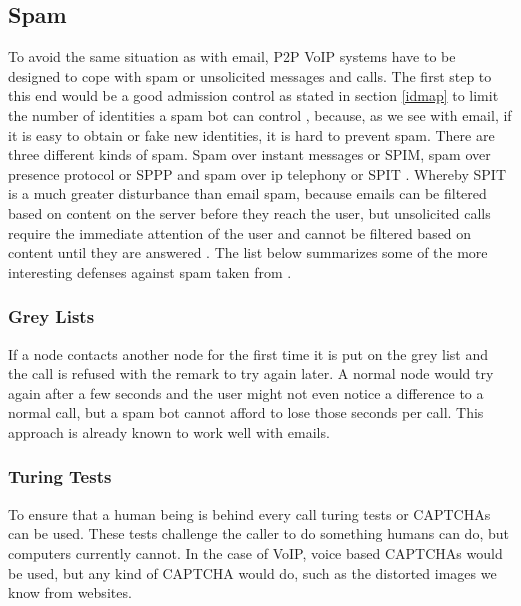 \documentclass[a4paper,10pt]{article}
\begin{document}
\subsection{Spam}
\label{spam}
To avoid the same situation as with email, P2P VoIP systems have to be designed
to cope with spam or unsolicited messages and calls. The first step to this end
would be a good admission control as stated in section \ref{idmap} to limit the
number of identities a spam bot can control \cite{touceda}, because, as we see
with email,
if it is easy to obtain or fake new identities, it is hard to prevent spam.
There are three different kinds of spam. Spam over instant messages or SPIM,
spam over
presence protocol or SPPP and spam over ip telephony or SPIT \cite{touceda}.
Whereby SPIT is a much greater disturbance than email spam, because emails can
be filtered based on content on the server before they reach the user, but
unsolicited calls require the immediate attention of the user and cannot be
filtered
based on content until they are answered \cite{heikkilae}. The list below
summarizes some of the more interesting defenses against spam taken from
\cite{touceda}.

\subsubsection{Grey Lists}
If a node contacts another node for the first time it is put on the grey list
and the call is refused with the remark to try again later.
A normal node would try again after a few seconds and the user might not even
notice a difference to a normal call, but a spam bot cannot afford to lose those
seconds per call.
This approach is already known to work well with emails.



\subsubsection{Turing Tests}
To ensure that a human being is behind every call turing tests or CAPTCHAs can
be used. These tests challenge the caller to do something
humans can do, but computers currently cannot. In the case of VoIP, voice based
CAPTCHAs would be used, but any kind
of CAPTCHA would do, such as the distorted images we know from websites.
\end{document}

